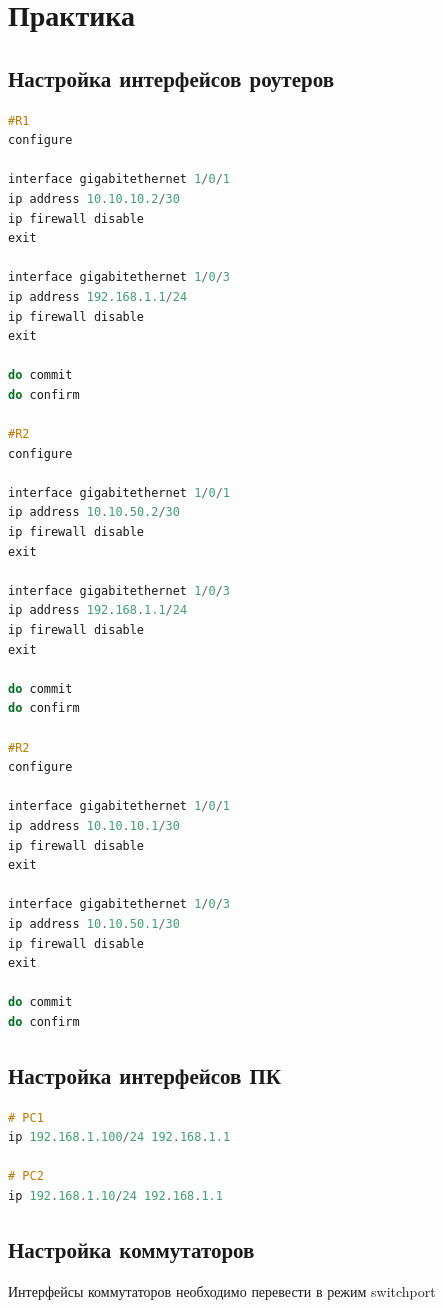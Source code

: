 \chapter{Практика}


\section{Настройка интерфейсов роутеров}

\begin{lstlisting}[language=C, caption={Пример настройки интерфейсов роутеров}]
#R1
configure

interface gigabitethernet 1/0/1
ip address 10.10.10.2/30
ip firewall disable
exit

interface gigabitethernet 1/0/3
ip address 192.168.1.1/24
ip firewall disable
exit

do commit
do confirm
 
#R2
configure

interface gigabitethernet 1/0/1
ip address 10.10.50.2/30
ip firewall disable
exit

interface gigabitethernet 1/0/3
ip address 192.168.1.1/24
ip firewall disable
exit

do commit
do confirm

#R2
configure

interface gigabitethernet 1/0/1
ip address 10.10.10.1/30
ip firewall disable
exit

interface gigabitethernet 1/0/3
ip address 10.10.50.1/30
ip firewall disable
exit

do commit
do confirm
\end{lstlisting}


\section{Настройка интерфейсов ПК}

\begin{lstlisting}[language=C, caption={Пример настройки интерфейсов ПК}]
# PC1
ip 192.168.1.100/24 192.168.1.1

# PC2
ip 192.168.1.10/24 192.168.1.1
\end{lstlisting}

\section{Настройка коммутаторов}

Интерфейсы коммутаторов необходимо перевести в режим switchport

